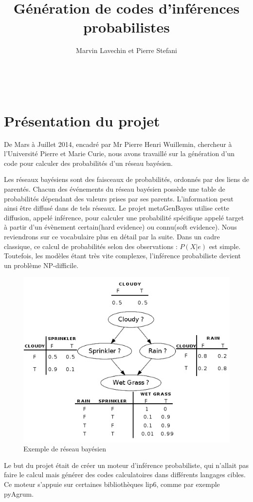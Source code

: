 \documentclass[a4paper]{article}
\title{Génération de codes d'inférences probabilistes	}
\author{Marvin Lavechin et Pierre Stefani}
\begin{document}
\maketitle
\thispagestyle{empty}

\newpage
\thispagestyle{empty}
\setcounter{page}{0}
~
\newpage
\tableofcontents

\newpage
 \section{Présentation du projet}
 De Mars à Juillet 2014, encadré par Mr Pierre Henri Wuillemin, chercheur à l'Université Pierre et Marie Curie, nous avons 
 travaillé sur la génération d'un code pour calculer des probabilités d'un réseau bayésien.
 \par \medbreak
 Les réseaux bayésiens sont des faisceaux de probabilités, ordonnés par des liens de parentés. Chacun des événements du réseau bayésien
 possède une table de probabilités dépendant des valeurs prises par ses parents. L'information peut ainsi être diffusé dans de tels réseaux.
 Le projet metaGenBayes utilise cette diffusion, appelé inférence, pour calculer une probabilité spécifique appelé target à partir d'un 
 évènement certain(hard evidence) ou connu(soft evidence). Nous reviendrons sur ce vocabulaire plus en détail par la suite.
 Dans un cadre classique, ce calcul de probabilités selon des observations : $P(X|e)$ est simple. Toutefois, les modèles étant très vite complexes, l'inférence probabiliste devient
 un problème NP-difficile.
 \begin{figure}[h!]
  \includegraphics[width=\linewidth]{Images/Waterprinkler.png}
  \caption{Exemple de réseau bayésien}
  \label{fig:bn1}
 \end{figure}
\par \medbreak
Le but du projet était de créer un moteur d'inférence probabiliste, qui n'allait pas faire le calcul mais générer des codes calculatoires dans différents langages cibles. Ce moteur
s'appuie sur certaines bibliothèques lip6, comme par exemple pyAgrum.
\end{document}
